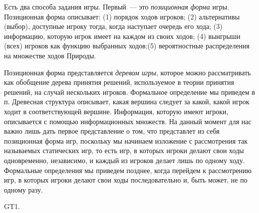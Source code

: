 Есть два способа задания игры. Первый~--- это {\it позиционная
форма} игры. Позиционная форма описывает: (1) порядок ходов игроков;
(2) альтернативы (выбор), доступные игроку тогда, когда наступает
очередь его хода;
(3) информацию, которую игрок имеет на каждом из своих ходов; (4)
выигрыши (всех) игроков как функцию выбранных ходов;(5)
вероятностные распределения на множестве ходов Природы.

Позиционная форма представляется {\it деревом игры}, которое можно
рассматривать как обобщение дерева принятия решений, используемое в
теории принятия решений, на случай нескольких игроков. Формальное
определение мы приведем в п.      Древесная структура описывает,
какая вершина следует за какой, какой игрок ходит в соответствующей
вершине. Информация, которую имеют игроки, описывается с помощью
информационных множеств. На данный момент для нас
важно лишь дать первое представление о том, что представлет из
себя позиционная форма игр, поскольку мы начинаем изложение с
рассмотрения так называемых статических игр, то есть игр, в которых
игроки делают свои ходы одновременно, независимо, и каждый из игроков
делает лишь по одному ходу. Формальные определения мы приведем позднее,
когда перейдем к рассмотрению игр, в которых игроки делают свои ходы
последовательно и, быть может, не по одному разу.

GT1.

